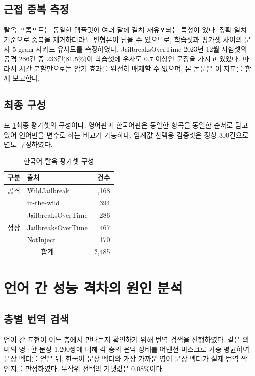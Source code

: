 \documentclass[twocolumn, 10pt]{article}
\begin{document}
\subsection{근접 중복 측정}
탈옥 프롬프트는 동일한 템플릿이 여러 달에 걸쳐 재유포되는 특성이 있다.
정확 일치 기준으로 중복을 제거하더라도 변형본이 남을 수 있으므로, 학습셋과 평가셋 사이의 문자 5-gram 자카드 유사도를 측정하였다.
JailbreaksOverTime 2023년 12월 시험셋의 공격 286건 중 233건(81.5\%)이 학습셋에 유사도 0.7 이상인 문장을 가지고 있었다.
따라서 시간 분할만으로는 암기 효과를 완전히 배제할 수 없으며, 본 논문은 이 지표를 함께 보고한다.

\subsection{최종 구성}
표 \ref{tab:eval}\은 최종 평가셋의 구성이다.
영어판과 한국어판은 동일한 항목을 동일한 순서로 담고 있어 언어만을 변수로 하는 비교가 가능하다.
임계값 선택용 검증셋은 정상 300건으로 별도 구성하였다.

\begin{table}[t]
\caption{한국어 탈옥 평가셋 구성}
\label{tab:eval}
\begin{center}
\begin{tabular}{l|l|r}
\hline
구분 & 출처 & 건수 \\
\hline
공격 & WildJailbreak & 1,168 \\
     & in-the-wild & 394 \\
     & JailbreaksOverTime & 286 \\
\hline
정상 & JailbreaksOverTime & 467 \\
     & NotInject & 170 \\
\hline
\multicolumn{2}{c|}{합계} & 2,485 \\
\hline
\end{tabular}
\end{center}
\end{table}

\section{언어 간 성능 격차의 원인 분석}

\subsection{층별 번역 검색}
언어 간 표현이 어느 층에서 만나는지 확인하기 위해 번역 검색을 진행하였다.
같은 의미의 영·한 문장 1{,}200쌍에 대해 각 층의 은닉 상태를 어텐션 마스크로 가중 평균하여 문장 벡터를 얻은 뒤, 한국어 문장 벡터와 가장 가까운 영어 문장 벡터가 실제 번역 짝인지를 판정하였다.
무작위 선택의 기댓값은 0.08\%이다.
\end{document}
